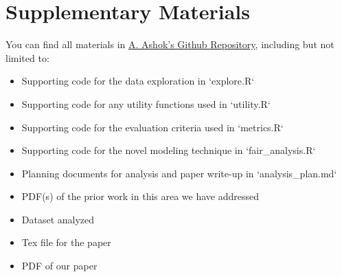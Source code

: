 \documentclass{article}
\begin{document}
\section*{Supplementary Materials}
You can find all materials in \href{https://github.com/ArjunAshok17/ECS-189G/tree/7dc23ae5986f590f51ca1c3195e4d9f95c2f2f11/TermProject}{A. Ashok's Github Repository}, including but not limited to:
\begin{itemize}
    \item Supporting code for the data exploration in `explore.R`
    \item Supporting code for any utility functions used in `utility.R`
    \item Supporting code for the evaluation criteria used in `metrics.R`
    \item Supporting code for the novel modeling technique in `fair\_analysis.R`
    \item Planning documents for analysis and paper write-up in `analysis\_plan.md`
    \item PDF(s) of the prior work in this area we have addressed
    \item Dataset analyzed
    \item Tex file for the paper
    \item PDF of our paper
\end{itemize}

\printbibliography
\end{document}
